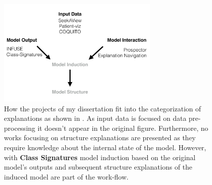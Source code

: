 \begin{figure}[b!]
\centering
\includegraphics[height=14em]{figs/motivation/content}
\caption{
How the projects of my dissertation fit into the categorization of explanations
as shown in .
As input data is focused on data pre-processing it doesn't appear in the
original figure. Furthermore, no works focusing on structure explanations are
presented as they require knowledge about the internal state of the model.
However, with \textbf{Class Signatures} model induction based on the original
model's outputs and subsequent structure explanations of the induced model are
part of the work-flow.
}
\label{figs:motivation_content}
\end{figure}